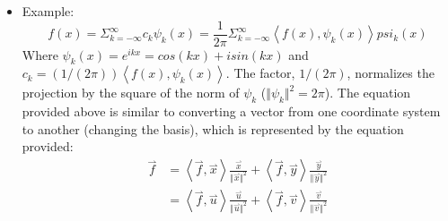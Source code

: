\documentclass[11.5pt,a4paper]{article}
\begin{document}
\begin{itemize}
    \item Example:
    \begin{equation*}
        f(x) = \Sigma_{k=-\infty}^{\infty} c_k\psi_k(x) = \frac{1}{2\pi} \Sigma_{k=-\infty}^{\infty} \left<f(x), \psi_k (x) \right>psi_k (x)
    \end{equation*}
    Where $\psi_k(x) = e^{ikx} = cos(kx) + isin(kx)$ and $c_k = (1/(2\pi))\left<f(x),\psi_k(x)\right>$. The factor, $1/(2\pi)$, normalizes the projection by the square of the norm of $\psi_k$ ($\Vert \psi_k \Vert^2 = 2\pi$). The equation provided above is similar to converting a vector from one coordinate system to another (changing the basis), which is represented by the equation provided:
    \begin{align*}
        \overset{\rightharpoonup}{f} &= \left<\overset{\rightharpoonup}{f}, \overset{\rightharpoonup}{x} \right> \frac{\overset{\rightharpoonup}{x}}{\Vert \overset{\rightharpoonup}{x} \Vert^2} + \left<\overset{\rightharpoonup}{f}, \overset{\rightharpoonup}{y} \right> \frac{\overset{\rightharpoonup}{y}}{\Vert \overset{\rightharpoonup}{y} \Vert^2} \\
        &= \left<\overset{\rightharpoonup}{f}, \overset{\rightharpoonup}{u} \right> \frac{\overset{\rightharpoonup}{u}}{\Vert \overset{\rightharpoonup}{u} \Vert^2} + \left<\overset{\rightharpoonup}{f}, \overset{\rightharpoonup}{v} \right> \frac{\overset{\rightharpoonup}{v}}{\Vert \overset{\rightharpoonup}{v} \Vert^2} 
    \end{align*}
\end{itemize}
\end{document}
